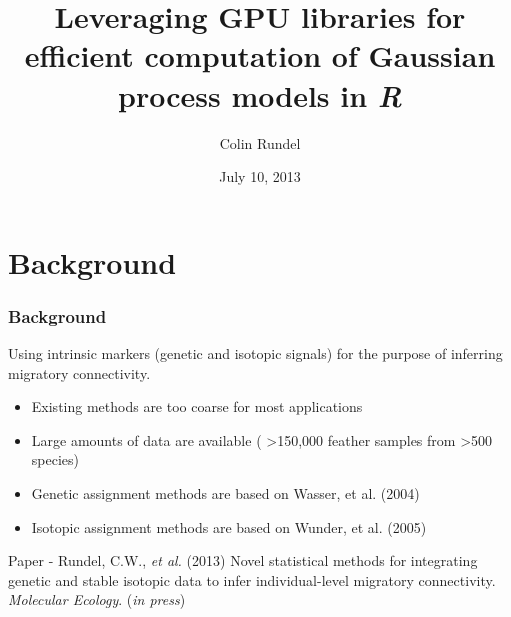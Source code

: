 \documentclass{beamer}
\title[UseR! 2013]{Leveraging GPU libraries for efficient computation of Gaussian process models in \textit{R}}
\author{Colin Rundel}
\date{July 10, 2013}
\institute[Duke]{Duke University, Department of Statistical Science}
\begin{document}
\begin{frame}[plain]
\titlepage
\end{frame}


\section{Background}
\addtocounter{framenumber}{-1} 


\begin{frame}
\frametitle{Background}


Using intrinsic markers (genetic and isotopic signals) for the purpose of inferring migratory connectivity.

\begin{itemize}
\item Existing methods are too coarse for most applications
\item Large amounts of data are available ( \textgreater{}150,000 feather samples from \textgreater{}500 species)
\item Genetic assignment methods are based on Wasser, et al. (2004)
\item Isotopic assignment methods are based on Wunder, et al. (2005)
\end{itemize}

\vspace{3mm} \pause

Paper - Rundel, C.W., \textit{et al.} (2013) Novel statistical methods for integrating genetic and stable isotopic data to infer individual-level migratory connectivity. \textit{Molecular Ecology}. (\textit{in press})

\end{frame}


\end{document}
